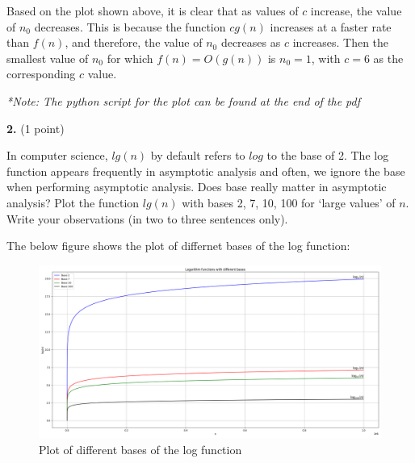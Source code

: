 \documentclass[addpoints]{exam}
\begin{document}
\begin{questions}
\begin{solution}
    Based on the plot shown above, it is clear that as values of $c$ increase, the value of $n_0$ decreases. This is because the function $cg(n)$ increases at a faster rate than $f(n)$, and therefore, the value of $n_0$ decreases as $c$ increases. Then the smallest value of $n_0$ for which $ f(n) = O(g(n)) $ is $ n_0 = 1 $, with $ c = 6 $ as the corresponding $c$ value.



    \textit{*Note: The python script for the plot can be found at the end of the pdf}
  \end{solution}

  \newpage
  \question[1]
  \textbf{2.}\; (1 point)

  In computer science, $ lg(n) $ by default refers to $ log $ to the base of 2. The log function appears frequently in asymptotic analysis and often, we ignore the base when performing asymptotic analysis. Does base really matter in asymptotic analysis? Plot the function $ lg(n) $ with bases 2, 7, 10, 100 for `large values' of $n$. Write your observations (in two to three sentences only).

  \begin{solution}
    The below figure shows the plot of differnet bases of the log function:
    \begin{figure}[H]
      \centering
      \includegraphics[width=1\textwidth]{Figure_2.png}
      \caption{Plot of different bases of the log function}
    \end{figure}


\end{solution}
\end{questions}
\end{document}
